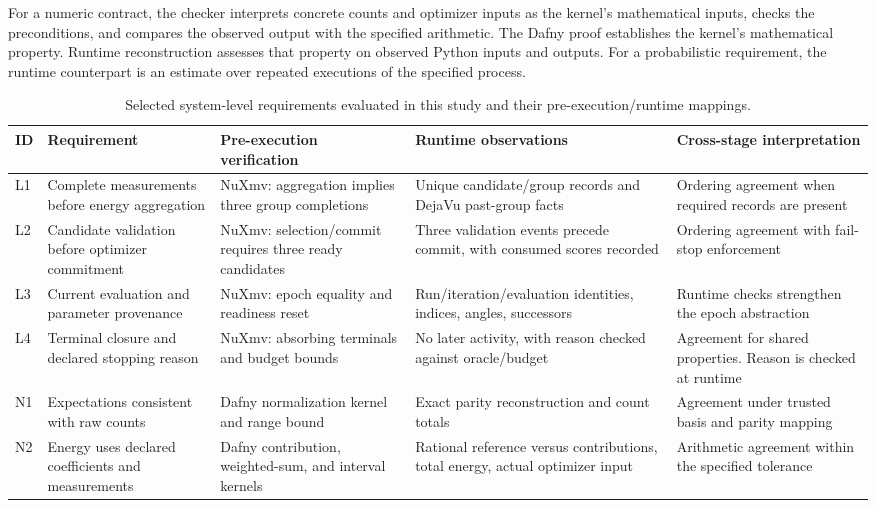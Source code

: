 \documentclass[conference]{IEEEtran}
\begin{document}
For a numeric contract, the checker interprets concrete counts and optimizer inputs as the kernel's mathematical inputs, checks the preconditions, and compares the observed output with the specified arithmetic. The Dafny proof establishes the kernel's mathematical property. Runtime reconstruction assesses that property on observed Python inputs and outputs. For a probabilistic requirement, the runtime counterpart is an estimate over repeated executions of the specified process.

\begin{table}[!t]
\centering\footnotesize
\caption{Selected system-level requirements evaluated in this study and their pre-execution/runtime mappings.}
\label{tab:mapping}
\begin{tabularx}{\textwidth}{@{}p{}>{\raggedright\arraybackslash}p{}>{\raggedright\arraybackslash}p{}>{\raggedright\arraybackslash}p{}Y@{}}
\toprule
ID & Requirement & Pre-execution verification & Runtime observations & Cross-stage interpretation \\
\midrule
L1 & Complete measurements before energy aggregation & NuXmv: aggregation implies three group completions & Unique candidate/group records and DejaVu past-group facts & Ordering agreement when required records are present \\
L2 & Candidate validation before optimizer commitment & NuXmv: selection/commit requires three ready candidates & Three validation events precede commit, with consumed scores recorded & Ordering agreement with fail-stop enforcement \\
L3 & Current evaluation and parameter provenance & NuXmv: epoch equality and readiness reset & Run/iteration/evaluation identities, indices, angles, successors & Runtime checks strengthen the epoch abstraction \\
L4 & Terminal closure and declared stopping reason & NuXmv: absorbing terminals and budget bounds & No later activity, with reason checked against oracle/budget & Agreement for shared properties. Reason is checked at runtime \\
N1 & Expectations consistent with raw counts & Dafny normalization kernel and range bound & Exact parity reconstruction and count totals & Agreement under trusted basis and parity mapping \\
N2 & Energy uses declared coefficients and measurements & Dafny contribution, weighted-sum, and interval kernels & Rational reference versus contributions, total energy, actual optimizer input & Arithmetic agreement within the specified tolerance \\

\end{tabularx}
\end{table}
\end{document}
